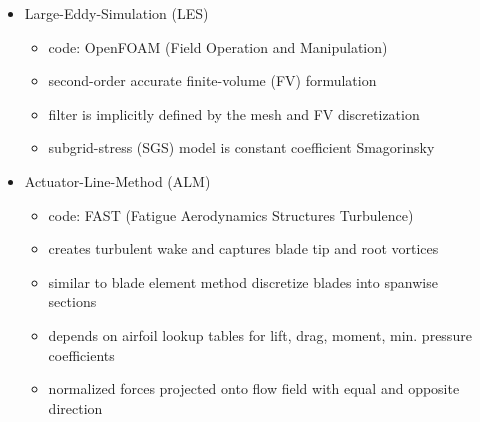 \documentclass[xcolor=x11names,compress]{beamer}
\begin{document}
\begin{frame}{}
\begin{columns}
\begin{column}{0.3\textwidth}
    \end{column}
    
    \begin{column}{0.875\textwidth}
		
		\begin{itemize}
			\item \small Large-Eddy-Simulation (LES)
			\vspace{-5pt}
				\begin{itemize}
					\item \small code: OpenFOAM (\scriptsize{Field Operation and Manipulation})
					\item second-order accurate finite-volume (FV) formulation 
					\item filter is implicitly defined by the mesh and FV discretization
					\item subgrid-stress (SGS) model is constant coefficient Smagorinsky
				\end{itemize}

			\item Actuator-Line-Method (ALM)
			\vspace{-5pt}
				\begin{itemize}
					\item \small code: FAST (\scriptsize{Fatigue Aerodynamics Structures Turbulence})
					\item creates turbulent wake and captures blade tip and root vortices
					\item similar to blade element method discretize blades into spanwise sections
					\item depends on airfoil lookup tables for lift, drag, moment, min. pressure coefficients
					\item normalized forces projected onto flow field with equal and opposite direction
				\end{itemize}

		\end{itemize}
    
    \end{column}

\end{columns}



\end{frame}



\end{document}
